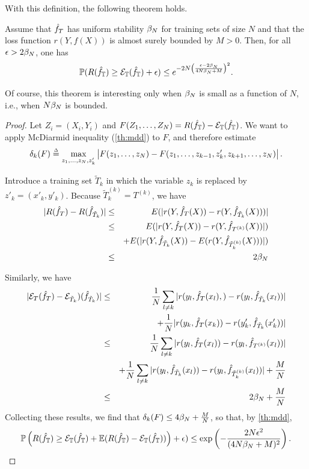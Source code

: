 With this definition, the following theorem holds.
\begin{theorem}
Assume that ${\hat{f}}_T$ has uniform stability $\beta_N$ for training sets of size $N$ and that the loss function $r(Y, f(X))$  is almost surely bounded by $M>0$. Then, for all $\epsilon > 2\beta_N$, one has
\[
\bm{\mathbb P}(R({\hat{f}}_{\mathbb T}) \geq {\mathcal E}_{\mathbb T}({\hat{f}}_{\mathbb T}) + \epsilon) \leq e^{-2N \left(\frac{\epsilon - 2\beta_N}{4N\beta_N +M}\right)^2}.
\]
\end{theorem}
Of course, this theorem is interesting only when $\beta_N$ is small as a function of $N$, i.e., when $N\beta_N$ is bounded.
\begin{proof}
Let $Z_i = (X_i, Y_i)$ and $F(Z_1, \dots, Z_N) = R({\hat{f}}_{\mathbb T}) - {\mathcal E}_{\mathbb T}({\hat{f}}_{\mathbb T})$. We want to apply McDiarmid inequality (\cref{th:mdd}) to $F$, and therefore estimate 
\[
\delta_k(F) \stackrel{{\scriptscriptstyle \Delta}}{=}  \max_{z_1, \ldots, z_N, z'_k} \big| F(z_1, \ldots, z_N) - F(z_1, \ldots, z_{k-1}, z'_k, z_{k+1}, \ldots, z_N)\big|\,.
\]

Introduce a training set $\tilde T_k$ in which the variable $z_k$ is replaced by $z'_k=(x'_k, y'_k)$. Because $\tilde T_k^{(k)} = T^{(k)}$, we have 
\begin{eqnarray*}
|R({\hat{f}}_T) - R({\hat{f}}_{\tilde T_k})| &\leq& E(|r(Y, {\hat{f}}_T(X)) - r(Y, {\hat{f}}_{\tilde T_k}(X)))|\\
&\leq& E(|r(Y, {\hat{f}}_T(X)) - r(Y, {\hat{f}}_{T^{(k)}}(X))|) \\
&&+ E(|r(Y, {\hat{f}}_{\tilde T_k}(X)) - E(r(Y, {\hat{f}}_{\tilde T_k^{(k)}}(X)))|)\\
& \leq& 2\beta_N
\end{eqnarray*}

Similarly, we have
\begin{eqnarray*}
|{\mathcal E}_T({\hat{f}}_T) - {\mathcal E}_{\tilde T_k})({\hat{f}}_{\tilde T_k})| &\leq& \frac 1N \sum_{l\neq k} |r(y_l, {\hat{f}}_T(x_l),) - r(y_l, {\hat{f}}_{\tilde T_k}(x_l))| \\
&& + \frac1 N |r(y_k, {\hat{f}}_T(x_k)) - r(y'_k, {\hat{f}}_{\tilde T_k}(x'_k))|\\
&\leq& \frac 1N \sum_{l\neq k} |r(y_l, {\hat{f}}_T(x_l)) - r(y_l, {\hat{f}}_{T^{(k)}}(x_l))| \\
&&+ \frac 1N \sum_{l\neq k} |r(y_l, {\hat{f}}_{\tilde T_k}(x_l)) - r(y_l, {\hat{f}}_{\tilde T^{(k)}_k}(x_l))| + \frac M N\\
&\leq & 2\beta_N + \frac MN
\end{eqnarray*}
Collecting these results, we find that  $\delta_k(F) \leq 4\beta_N + \frac MN$, so that, by  \cref{th:mdd}, 
\[
\bm{\mathbb P}\left(R({\hat{f}}_{\mathbb T}) \geq {\mathcal E}_{\mathbb T}({\hat{f}}_{\mathbb T}) + \bm{\mathbb E}(R({\hat{f}}_{\mathbb T}) - {\mathcal E}_{\mathbb T}({\hat{f}}_{\mathbb T}))\right) + \epsilon) \leq \exp\left(- \frac{2N\epsilon^2}{(4N\beta_N + M)^2}\right).
\]


\end{proof}
